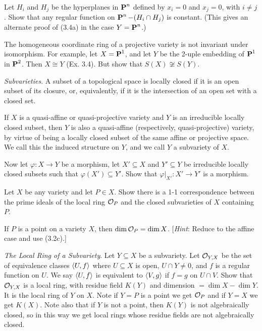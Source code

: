 \documentclass[10pt]{amsart}
\begin{document}
\begin{exercise}[3.8]
    Let $H_i$ and $H_j$ be the hyperplanes in $\operatorname{\mathbf{P}}^n$ defined by 
    $x_i = 0$ and $x_j = 0$, with $i \ne j$. Show that any regular function on 
    $\operatorname{\mathbf{P}}^n - (H_i \cap H_j)$ is constant. 
    (This gives an alternate proof of (3.4a) in the case $Y = \operatorname{\mathbf{P}}^n$.)
\end{exercise}


\begin{exercise}[3.9]
    The homogeneous coordinate ring of a projective variety is not invariant under 
    isomorphism. For example, let $X = \operatorname{\mathbf{P}}^1$, and let $Y$ be the 2-uple embedding of $\operatorname{\mathbf{P}}^1$ in $\operatorname{\mathbf{P}}^2$. 
    Then $X \cong Y$ (Ex. 3.4). But show that $S(X) \not\cong S(Y)$.
\end{exercise}


\begin{exercise}[3.10]
    \emph{Subvarieties}. A subset of a topological space is locally closed if it is an 
    open subset of its closure, or, equivalently, if it is the intersection of an open set with 
    a closed set.
    
    If $X$ is a quasi-affine or quasi-projective variety and $Y$ is an irreducible locally closed 
    subset, then $Y$ is also a quasi-affine (respectively, quasi-projective) variety, by virtue 
    of being a locally closed subset of the same affine or projective space. We call this the induced 
    structure on $Y$, and we call $Y$ a subvariety of $X$.
    
    Now let $\varphi:X \to Y$ be a morphism, let $X' \subseteq X$ and $Y' \subseteq Y$ be irreducible locally closed subsets 
    such that $\varphi(X') \subseteq Y'$. Show that $\varphi|_{X'} :X' \to Y'$ 
    is a morphism.
\end{exercise}


\begin{exercise}[3.11]
    Let $X$ be any variety and let $P \in X$. Show there is a 1-1 correspondence between
    the prime ideals of the local ring $\mathcal{O}_P$ and the closed subvarieties of $X$ containing $P$.
\end{exercise}


\begin{exercise}[3.12]
    If $P$ is a point on a variety $X$, then $\dim \mathcal{O}_P = \dim X$. [\emph{Hint}: Reduce to the
    affine case and use (3.2c).]
\end{exercise}


\begin{exercise}[3.13]
    \emph{The Local Ring of a Subvariety}. Let $Y \subseteq X$ be a subvariety. Let $\mathcal{O}_{Y,X}$ be the set 
    of equivalence classes $\left\langle U,f\right\rangle$ where $U \subseteq X$ is open, $U \cap Y \ne 0$, and $f$ is a regular 
    function on $U$. We say $\left\langle U, f\right\rangle$ is equivalent to $\left\langle V, g\right\rangle$ if $f = g$ on $U \cap V$. Show that 
    $\mathcal{O}_{Y,X}$ is a local ring, with residue field $K(Y)$ and dimension $= \dim X - \dim Y$. It is the local ring 
    of $Y$ on $X$. Note if $Y = P$ is a point we get $\mathcal{O}_{P}$ and if $Y = X$ we get $K(X)$. 
    Note also that if $Y$ is not a point, then $K(Y)$ is not algebraically closed, so in this way we 
    get local rings whose residue fields are not algebraically closed.
\end{exercise}
\end{document}
